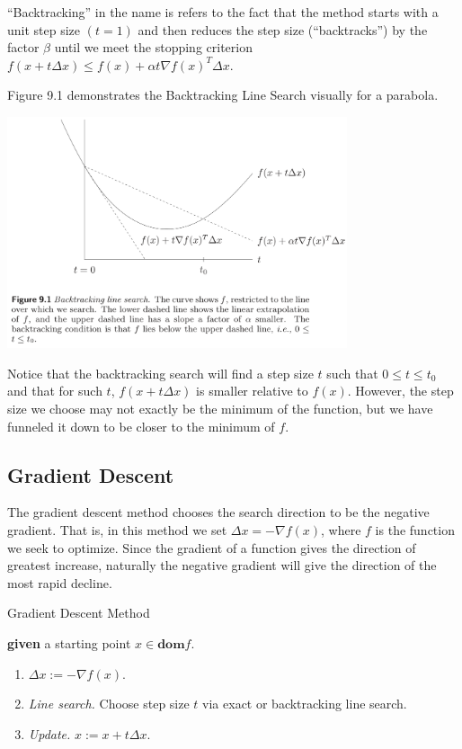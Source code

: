 ``Backtracking'' in the name is refers to the fact that the method starts with a unit step size $(t=1)$ and then reduces the step size (``backtracks'') by the factor $\beta$ until we meet the stopping criterion $f(x+t\Delta x)\leq f(x)+\alpha t\nabla f(x)^T\Delta x$.


Figure 9.1 \cite[p. 465]{Boyd2004} demonstrates the Backtracking Line Search visually for a parabola.
\begin{center}
	\includegraphics[width=0.75\textwidth]{Chapter_I_Background/Images/backtracking_line_search_diagram.png}
\end{center}

Notice that the backtracking search will find a step size $t$ such that $0\leq t\leq t_0$ and that for such $t$, $f(x+t\Delta x)$ is smaller relative to $f(x)$. However, the step size we choose may not exactly be the minimum of the function, but we have funneled it down to be closer to the minimum of $f$.
\subsection{Gradient Descent}

The gradient descent method chooses the search direction to be the negative gradient. That is, in this method we set $\Delta x=-\nabla f(x)$, where $f$ is the function we seek to optimize. Since the gradient of a function gives the direction of greatest increase, naturally the negative gradient will give the direction of the most rapid decline.

\begin{algorithm}
	\caption{Gradient Descent Method \cite{Boyd2004}\label{GradientDescentAlg}}
	\begin{algorithmic} 
		\State \textbf{given} a starting point $x\in\textbf{dom}f$.
		\Repeat
		\begin{enumerate}
			\item $\Delta x:=-\nabla f(x)$.
			\item \textit{Line search.} Choose step size $t$ via exact or backtracking line search.
			\item \textit{Update.} $x:=x+t\Delta x$.
		\end{enumerate}
	\end{algorithmic}
\end{algorithm}

